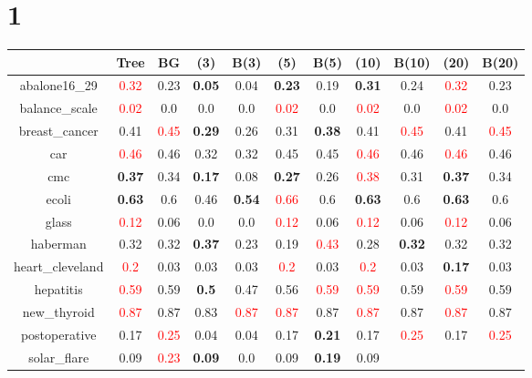 \documentclass{article}%
\begin{document}
\section*{1}%
\begin{tabular}{c|cccccccccc}%
\hline%
&Tree&BG&(3)&B(3)&(5)&B(5)&(10)&B(10)&(20)&B(20)\\%
\hline%
abalone16\_29&\textcolor{red}{ 
0.32
}&0.23&\textbf{0.05}&0.04&\textbf{0.23}&0.19&\textbf{0.31}&0.24&\textcolor{red}{ 
0.32
}&0.23\\%
\hline%
balance\_scale&\textcolor{red}{ 
0.02
}&0.0&0.0&0.0&\textcolor{red}{ 
0.02
}&0.0&\textcolor{red}{ 
0.02
}&0.0&\textcolor{red}{ 
0.02
}&0.0\\%
\hline%
breast\_cancer&0.41&\textcolor{red}{ 
0.45
}&\textbf{0.29}&0.26&0.31&\textbf{0.38}&0.41&\textcolor{red}{ 
0.45
}&0.41&\textcolor{red}{ 
0.45
}\\%
\hline%
car&\textcolor{red}{ 
0.46
}&0.46&0.32&0.32&0.45&0.45&\textcolor{red}{ 
0.46
}&0.46&\textcolor{red}{ 
0.46
}&0.46\\%
\hline%
cmc&\textbf{0.37}&0.34&\textbf{0.17}&0.08&\textbf{0.27}&0.26&\textcolor{red}{ 
0.38
}&0.31&\textbf{0.37}&0.34\\%
\hline%
ecoli&\textbf{0.63}&0.6&0.46&\textbf{0.54}&\textcolor{red}{ 
0.66
}&0.6&\textbf{0.63}&0.6&\textbf{0.63}&0.6\\%
\hline%
glass&\textcolor{red}{ 
0.12
}&0.06&0.0&0.0&\textcolor{red}{ 
0.12
}&0.06&\textcolor{red}{ 
0.12
}&0.06&\textcolor{red}{ 
0.12
}&0.06\\%
\hline%
haberman&0.32&0.32&\textbf{0.37}&0.23&0.19&\textcolor{red}{ 
0.43
}&0.28&\textbf{0.32}&0.32&0.32\\%
\hline%
heart\_cleveland&\textcolor{red}{ 
0.2
}&0.03&0.03&0.03&\textcolor{red}{ 
0.2
}&0.03&\textcolor{red}{ 
0.2
}&0.03&\textbf{0.17}&0.03\\%
\hline%
hepatitis&\textcolor{red}{ 
0.59
}&0.59&\textbf{0.5}&0.47&0.56&\textcolor{red}{ 
0.59
}&\textcolor{red}{ 
0.59
}&0.59&\textcolor{red}{ 
0.59
}&0.59\\%
\hline%
new\_thyroid&\textcolor{red}{ 
0.87
}&0.87&0.83&\textcolor{red}{ 
0.87
}&\textcolor{red}{ 
0.87
}&0.87&\textcolor{red}{ 
0.87
}&0.87&\textcolor{red}{ 
0.87
}&0.87\\%
\hline%
postoperative&0.17&\textcolor{red}{ 
0.25
}&0.04&0.04&0.17&\textbf{0.21}&0.17&\textcolor{red}{ 
0.25
}&0.17&\textcolor{red}{ 
0.25
}\\%
\hline%
solar\_flare&0.09&\textcolor{red}{ 
0.23
}&\textbf{0.09}&0.0&0.09&\textbf{0.19}&0.09&\textcolor{red}{ 
}
\end{tabular}
\end{document}
